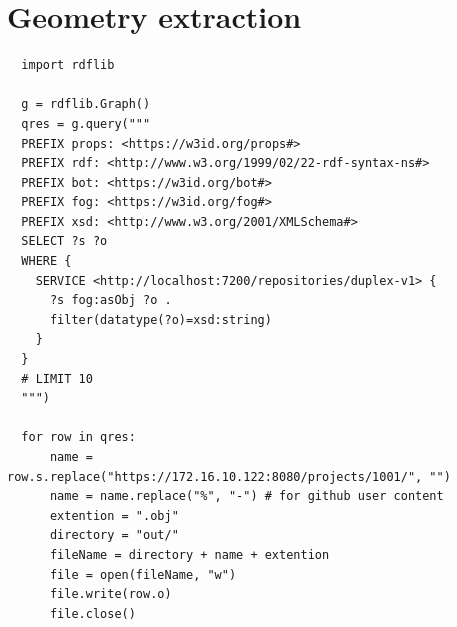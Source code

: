 \section{Geometry extraction}
\label{sec:pyhtonExtraction}
\begin{verbatim}
  import rdflib
  
  g = rdflib.Graph()
  qres = g.query("""
  PREFIX props: <https://w3id.org/props#>
  PREFIX rdf: <http://www.w3.org/1999/02/22-rdf-syntax-ns#>
  PREFIX bot: <https://w3id.org/bot#>
  PREFIX fog: <https://w3id.org/fog#>
  PREFIX xsd: <http://www.w3.org/2001/XMLSchema#>
  SELECT ?s ?o
  WHERE {
    SERVICE <http://localhost:7200/repositories/duplex-v1> {
      ?s fog:asObj ?o .
      filter(datatype(?o)=xsd:string)
    }
  }
  # LIMIT 10
  """)
  
  for row in qres:
      name = row.s.replace("https://172.16.10.122:8080/projects/1001/", "")
      name = name.replace("%", "-") # for github user content
      extention = ".obj"
      directory = "out/"
      fileName = directory + name + extention
      file = open(fileName, "w")
      file.write(row.o)
      file.close()
  \end{verbatim}